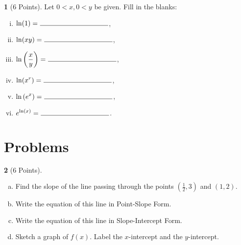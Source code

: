 \documentclass[12pt]{amsart}
\theoremstyle{definition}
\newtheorem{thm}{}
\theoremstyle{definition}
\begin{document}
\begin{thm}[6 Points]\label{ex2}
  Let $0 < x, 0 < y$ be given.
  Fill in the blanks:
  \vspace{.15in}
  \begin{multicols}{2}
    \begin{enumerate}[(i)]
    \item
      $\displaystyle{\ln(1) =\ \line(1,0){100}}$,
      \vspace{.15in}
    \item
      $\displaystyle{\ln(xy) =\ \line(1,0){100}}$,
      \vspace{.15in}
      \item
        $\displaystyle{\ln\left(\frac{x}{y}\right) =\ \line(1,0){100}}$,
        \vspace{.15in}
      \item
        $\displaystyle{\ln(x^r) =\ \line(1,0){100}}$,
        \vspace{.15in}
      \item
        $\displaystyle{\ln\left(e^x\right) =\ \line(1,0){100}}$,
        \vspace{.15in}
      \item
        $\displaystyle{e^{\ln(x)} =\ \line(1,0){100}}$.
    \end{enumerate}
  \end{multicols}
\end{thm}

\newpage

\section{Problems}
\setcounter{thm}{0}
\begin{thm}[6 Points]\label{ex5}
  \begin{enumerate}[(a)]
  \item
    Find the slope of the line passing through the points $\left(\frac{1}{2},3\right)$ and $(1,2)$.
    \vspace{2in}
  \item
    Write the equation of this line in Point-Slope Form.
    \vspace{2in}
  \item
    Write the equation of this line in Slope-Intercept Form.
    \vspace{2in}
  \item
    Sketch a graph of $f(x)$.
    Label the $x$-intercept and the $y$-intercept.
  \end{enumerate}
\end{thm}
\end{document}
